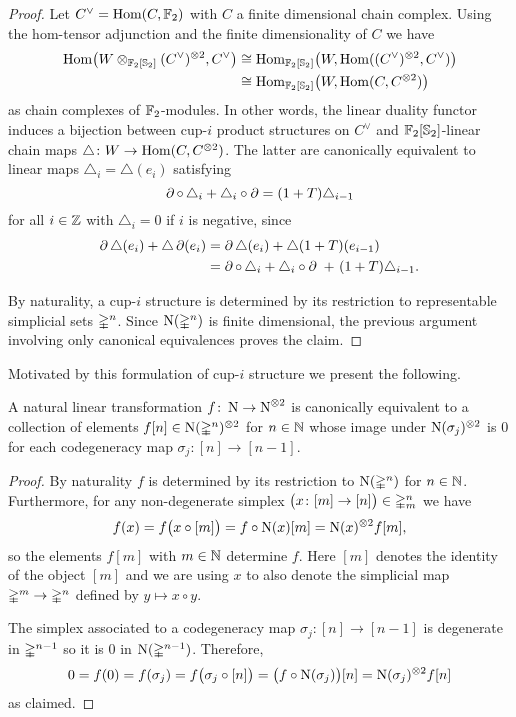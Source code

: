 \begin{proof}
	Let $C^\vee = \mathrm{Hom}(C, {\mathbb{F}_2})$ with $C$ a finite dimensional chain complex.
	Using the hom-tensor adjunction and the finite dimensionality of $C$ we have
	\begin{align*}
	\mathrm{Hom} \big(W \otimes_{{\mathbb{F}_2}[\mathbb{S}_2]} (C^\vee)^{\otimes 2}, C^\vee \big) & \cong
	\mathrm{Hom}_{{\mathbb{F}_2}[\mathbb{S}_2]} \big( W, \mathrm{Hom}((C^\vee)^{\otimes 2}, C^\vee) \big) \\ & \cong
	\mathrm{Hom}_{{\mathbb{F}_2}[\mathbb{S}_2]} \big( W, \mathrm{Hom}(C, C^{\otimes 2}) \big)
	\end{align*}
	as chain complexes of ${\mathbb{F}_2}$-modules.
	In other words, the linear duality functor induces a bijection between \mbox{cup-$i$} product structures on $C^\vee$ and ${\mathbb{F}_2}[\mathbb{S}_2]$-linear chain maps $\triangle \colon W \to \mathrm{Hom}(C, C^{\otimes 2})$.
	The latter are canonically equivalent to linear maps $\triangle_i = \triangle(e_i)$ satisfying
	\[
	\operatorname{\partial} \circ \, \triangle_i + \triangle_i \circ \operatorname{\partial} =
	(1+T) \triangle_{i-1}
	\]
	for all $i \in \mathbb{Z}$ with $\triangle_{i} = 0$ if $i$ is negative, since
	\begin{align*}
	\operatorname{\partial} \triangle (e_i) + \triangle \operatorname{\partial}(e_i) &=
	\operatorname{\partial} \triangle (e_i) + \triangle (1+T) (e_{i-1}) \\ &=
	\operatorname{\partial} \circ \, \triangle_i + \triangle_i \circ \operatorname{\partial} \ +\ (1+T) \triangle_{i-1}.
	\end{align*}

	By naturality, a \mbox{cup-$i$} structure is determined by its restriction to representable simplicial sets $\mathbb{\Delta}^n$.
	Since $\operatorname{N}(\mathbb{\Delta}^n)$ is finite dimensional, the previous argument involving only canonical equivalences proves the claim.
\end{proof}

Motivated by this formulation of \mbox{cup-$i$} structure we present the following.

\begin{lemma}\label{l:natural}
	A natural linear transformation $f \colon \operatorname{N} \to \operatorname{N}^{\otimes 2}$ is canonically equivalent to a collection of elements $f[n] \in \operatorname{N}(\mathbb{\Delta}^n)^{\otimes 2}$	for $n \in \mathbb{N}$ whose image under $\operatorname{N}(\sigma_j)^{\otimes 2}$ is $0$
	for each codegeneracy map $\sigma_j \colon [n] \to [n-1]$.
\end{lemma}

\begin{proof}
	By naturality $f$ is determined by its restriction to $\operatorname{N}(\mathbb{\Delta}^n)$ for $n \in \mathbb{N}$.
	Furthermore, for any non-degenerate simplex $\big( x \colon [m] \to [n] \big) \in \mathbb{\Delta}^n_m$ we have
	\[
	f(x) = f \big( x \circ [m] \big) =
	f \circ \operatorname{N}(x) [m] =
	\operatorname{N}(x)^{\otimes 2} f[m],
	\]
	so the elements $f[m]$ with $m \in \mathbb{N}$ determine $f$.
	Here $[m]$ denotes the identity of the object $[m]$ and we are using $x$ to also denote the simplicial map $\mathbb{\Delta}^m \to \mathbb{\Delta}^n$ defined by $y \mapsto x \circ y$.

	The simplex associated to a codegeneracy map $\sigma_j \colon [n] \to [n-1]$ is degenerate in $\mathbb{\Delta}^{n-1}$ so it is $0$ in $\operatorname{N}(\mathbb{\Delta}^{n-1})$.
	Therefore,
	\[
	0 = f(0) = f(\sigma_j) =
	f \big( \sigma_j \circ [n] \big) =
	\big( f \circ \operatorname{N}(\sigma_j) \big) [n] =
	\operatorname{N}(\sigma_j)^{\otimes 2} f[n]
	\]
	as claimed.
\end{proof}


